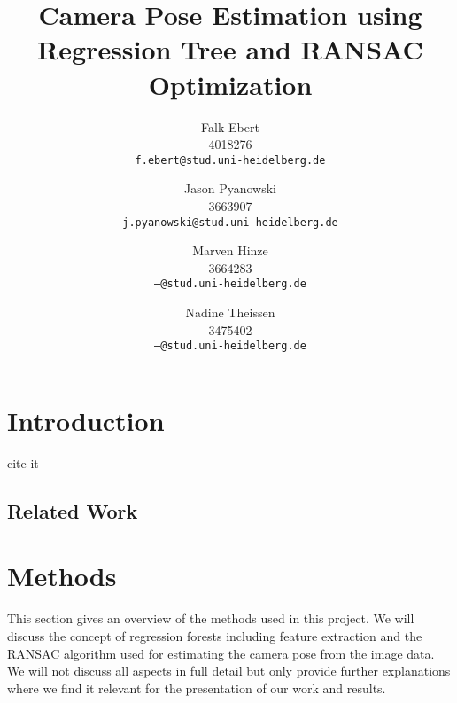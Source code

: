 \documentclass[final]{cvpr}
\begin{document}
\title{Camera Pose Estimation using Regression Tree and RANSAC Optimization}

\author{Falk Ebert\\
4018276\\
{\tt\small f.ebert@stud.uni-heidelberg.de}
\and
Jason Pyanowski\\
3663907\\
{\tt\small j.pyanowski@stud.uni-heidelberg.de}
\and
Marven Hinze\\
3664283\\
{\tt\small ---@stud.uni-heidelberg.de}
\and
Nadine Theissen\\
3475402\\
{\tt\small ---@stud.uni-heidelberg.de}
}

\maketitle


\begin{abstract}
   
\end{abstract}

\section{Introduction}
cite it~\cite{shotton2013}



\subsection{Related Work}


\section{Methods}
This section gives an overview of the methods used in this project. We will discuss
the concept of regression forests including feature extraction and the RANSAC algorithm
used for estimating the camera pose from the image data. We will not discuss all aspects
in full detail but only provide further explanations where we find it relevant
for the presentation of our work and results.
\end{document}
